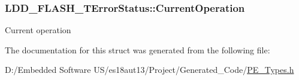 \subsubsection[{Current\+Operation}]{ L\+D\+D\+\_\+\+F\+L\+A\+S\+H\+\_\+\+T\+Error\+Status\+::\+Current\+Operation}\label{struct_l_d_d___f_l_a_s_h___t_error_status_aa1b99bfba14fdc8379522df15da47e7b}
Current operation 

The documentation for this struct was generated from the following file\+:\begin{DoxyCompactItemize}
\item 
D\+:/\+Embedded Software U\+S/es18aut13/\+Project/\+Generated\+\_\+\+Code/\hyperlink{_p_e___types_8h}{P\+E\+\_\+\+Types.\+h}\end{DoxyCompactItemize}
